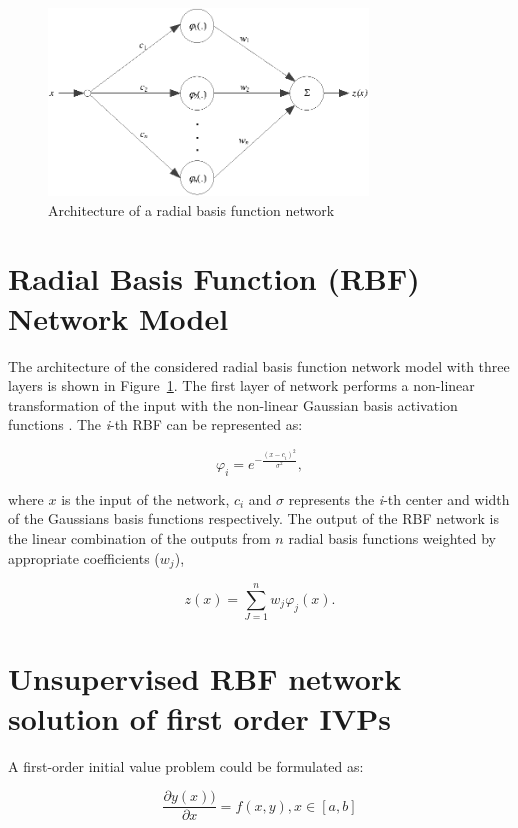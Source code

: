 \documentclass{mc}
\begin{document}
\begin{figure}
\centering
\includegraphics[width=8.5cm]{Fig1.eps}
\caption{Architecture of a radial basis function network}
\label{fig1}
\end{figure}

\section{Radial Basis Function (RBF) Network Model}

The architecture of the considered radial basis function network model with three layers is shown in Figure~\ref{fig1}. The first layer of network performs a non-linear transformation of the input with the non-linear Gaussian basis activation functions \cite{Chen6}. The {\it{i}}-th RBF can be represented as:

\begin{equation}
{\varphi_{i}=e^{-\frac{(x-c_{i})^{2}}{\sigma^{2}}}},
\end{equation}

where $x$ is the input of the network, $c_i$ and $\sigma$ represents the {\it{i}}-th center and width of the Gaussians basis functions respectively. The output of the RBF network is the linear combination of the outputs from $n$ radial basis functions weighted by appropriate coefficients (${w_j}$),

\begin{equation}
{z(x)=\sum_{J=1}^{n}w_j\varphi_j(x)}.
\end{equation}

\section{Unsupervised RBF network solution of first order IVPs}

A first-order initial value problem could be formulated as:

\begin{equation}
\frac{\partial y(x))}{\partial x}=f(x,y), x\in [a,b]
\end{equation}
\end{document}

